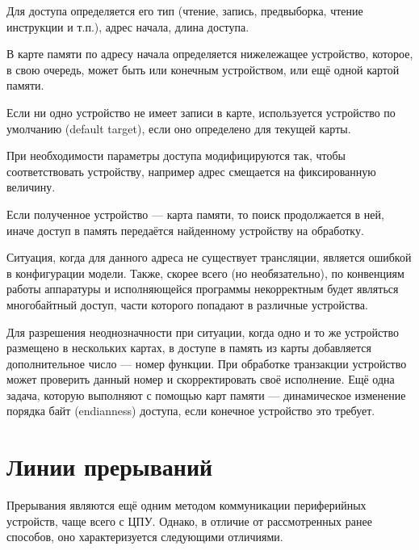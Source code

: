 \begin{enumerate*}
\item Для доступа определяется его тип (чтение, запись, предвыборка, чтение инструкции и т.п.), адрес начала, длина доступа.
\item В карте памяти по адресу начала определяется нижележащее устройство, которое, в свою очередь, может быть или конечным устройством, или ещё одной картой памяти.
\item Если ни одно устройство не имеет записи в карте, используется устройство по умолчанию (\abbr default target), если оно определено для текущей карты.
\item При необходимости параметры доступа модифицируются так, чтобы соответствовать устройству, например адрес смещается на фиксированную величину.
\item Если полученное устройство — карта памяти, то поиск продолжается в ней, иначе доступ в память передаётся найденному устройству на обработку. 
\item Ситуация, когда для данного адреса не существует трансляции, является ошибкой в конфигурации модели. Также, скорее всего (но необязательно), по конвенциям работы аппаратуры и исполняющейся программы некорректным будет являться многобайтный доступ, части которого попадают в различные устройства.
\end{enumerate*}

Для разрешения неоднозначности при ситуации, когда одно и то же устройство размещено в нескольких картах, в доступе в память из карты добавляется дополнительное число — номер функции. При обработке транзакции устройство может проверить данный номер и скорректировать своё исполнение. Ещё одна задача, которую выполняют с помощью карт памяти — динамическое изменение порядка байт (endianness) доступа, если конечное устройство это требует.

\section{Линии прерываний}

Прерывания являются ещё одним методом коммуникации пери\-фе\-рий\-ных устройств, чаще всего с ЦПУ. Однако, в отличие от рассмотренных ранее способов, оно характеризуется следующими отличиями.

